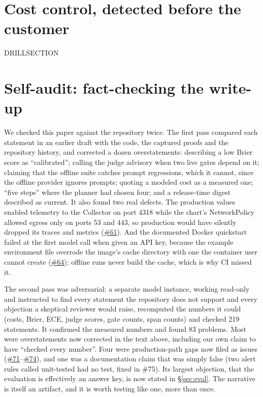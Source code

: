 \documentclass[11pt]{article}
\newcommand{\gh}[1]{\href{https://github.com/Organized-AI/podcast-agent/issues/#1}{\##1}}
\begin{document}
\section{Cost control, detected before the customer}\label{sec:drill}
DRILLSECTION

\section{Self-audit: fact-checking the write-up}\label{sec:selfaudit}

We checked this paper against the repository twice. The first pass compared each statement in an earlier draft with the code, the captured proofs and the repository history, and corrected a dozen overstatements: describing a low Brier score as ``calibrated''; calling the judge advisory when two live gates depend on it; claiming that the offline suite catches prompt regressions, which it cannot, since the offline provider ignores prompts; quoting a modeled cost as a measured one; ``five steps'' where the planner had chosen four; and a release-time digest described as current. It also found two real defects. The production values enabled telemetry to the Collector on port 4318 while the chart's NetworkPolicy allowed egress only on ports 53 and 443, so production would have silently dropped its traces and metrics (\gh{61}). And the documented Docker quickstart failed at the first model call when given an API key, because the example environment file overrode the image's cache directory with one the container user cannot create (\gh{64}); offline runs never build the cache, which is why CI missed it.

The second pass was adversarial: a separate model instance, working read-only and instructed to find every statement the repository does not support and every objection a skeptical reviewer would raise, recomputed the numbers it could (costs, Brier, ECE, judge scores, gate counts, span counts) and checked 219 statements. It confirmed the measured numbers and found 83 problems. Most were overstatements now corrected in the text above, including our own claim to have ``checked every number''. Four were production-path gaps now filed as issues (\gh{71}--\gh{74}), and one was a documentation claim that was simply false (two alert rules called unit-tested had no test, fixed in \#75). Its largest objection, that the evaluation is effectively an answer key, is now stated in \S\ref{sec:eval}. The narrative is itself an artifact, and it is worth testing like one, more than once.
\end{document}
